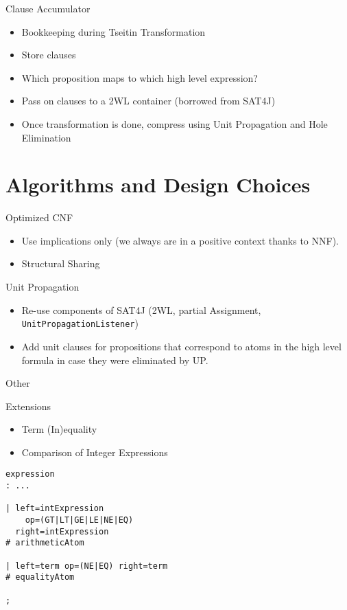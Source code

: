 \documentclass[smaller,dvipsnames,ratio=169]{beamer}
\begin{document}
  \begin{frame}{Clause Accumulator}
  	\begin{itemize}
	  	\item Bookkeeping during Tseitin Transformation
	  	\item Store clauses
  		\item Which proposition maps to which high level expression?
	  	\item Pass on clauses to a 2WL container (borrowed from SAT4J)
	  	\item Once transformation is done, compress using Unit Propagation and Hole Elimination
  	\end{itemize}
  \end{frame}


  \section{Algorithms and Design Choices}

  \begin{frame}{Optimized CNF}
  	\begin{itemize}
  		\item Use implications only (we always are in a positive context thanks to NNF).
  		\item Structural Sharing
  	\end{itemize}
  \end{frame}

  \begin{frame}{Unit Propagation}
  	\begin{itemize}
  		\item Re-use components of SAT4J (2WL, partial Assignment, \texttt{UnitPropagationListener})
  		\item Add unit clauses for propositions that correspond to atoms in the high level formula in case they were eliminated by UP.
  	\end{itemize}
  \end{frame}

  \begin{frame}{Other}
  \end{frame}
  
  \begin{frame}[fragile]{Extensions}
  	\begin{itemize}
  		\item Term (In)equality
  		\item Comparison of Integer Expressions
  	\end{itemize}
  	\begin{verbatim}
expression
: ...

| left=intExpression
    op=(GT|LT|GE|LE|NE|EQ)
  right=intExpression
# arithmeticAtom

| left=term op=(NE|EQ) right=term
# equalityAtom

;
  	\end{verbatim}
\end{frame}
\end{document}
